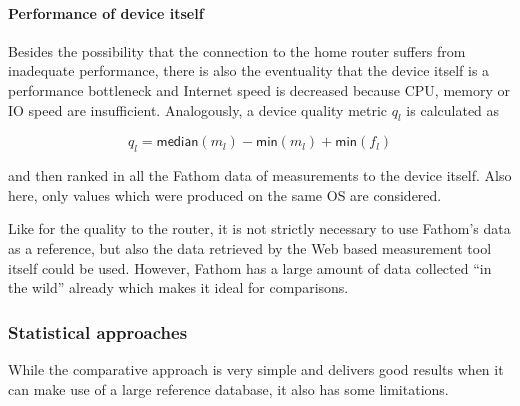 \documentclass{sig-alternate-10pt}
\begin{document}
\paragraph{Performance of device itself}

Besides the possibility that the connection to the home router suffers from inadequate performance, there is also the eventuality that the device itself is a performance bottleneck and Internet speed is decreased because CPU, memory or IO speed are insufficient. Analogously, a device quality metric $q_l$ is calculated as 

$$q_l = \textsf{median}(m_l) - \textsf{min}(m_l) + \textsf{min}(f_l)$$

and then ranked in all the Fathom data of measurements to the device itself. Also here, only values which were produced on the same OS are considered. 

Like for the quality to the router, it is not strictly necessary to use Fathom's data  as a reference, but also the data retrieved by the Web based measurement tool itself could be used. However, Fathom has a large amount of data collected ``in the wild'' already which makes it ideal for comparisons. 

\subsubsection{Statistical approaches}
\label{subsubsec:statistical}

While the comparative approach is very simple and delivers good results when it can make use of a large reference database, it also has some limitations. 
\end{document}
